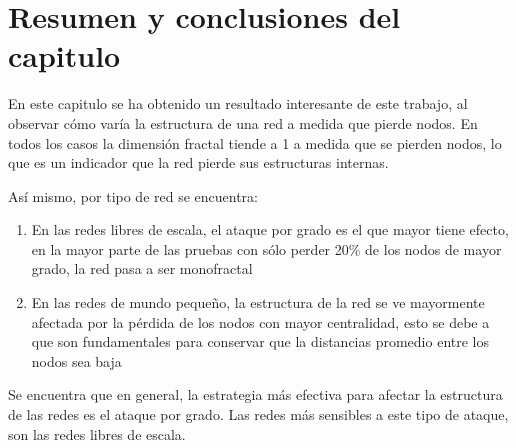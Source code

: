 
\section{Resumen y conclusiones del capitulo}

En este capitulo se ha obtenido un resultado interesante de este trabajo, al observar cómo varía la estructura de una red a medida que pierde nodos. En todos los casos la dimensión fractal tiende a 1 a medida que se pierden nodos, lo que es un indicador que la red pierde sus estructuras internas.

Así mismo, por tipo de red se encuentra:

\begin{enumerate}
    \item En las redes libres de escala, el ataque por grado es el que mayor tiene efecto, en la mayor parte de las pruebas con sólo perder 20\% de los nodos de mayor grado, la red pasa a ser monofractal
    \item En las redes de mundo pequeño, la estructura de la red se ve mayormente afectada por la pérdida de los nodos con mayor centralidad, esto se debe a que son fundamentales para conservar que la distancias promedio entre los nodos sea baja
\end{enumerate}

Se encuentra que en general, la estrategia más efectiva para afectar la estructura de las redes es el ataque por grado. Las redes más sensibles a este tipo de ataque, son las redes libres de escala.

